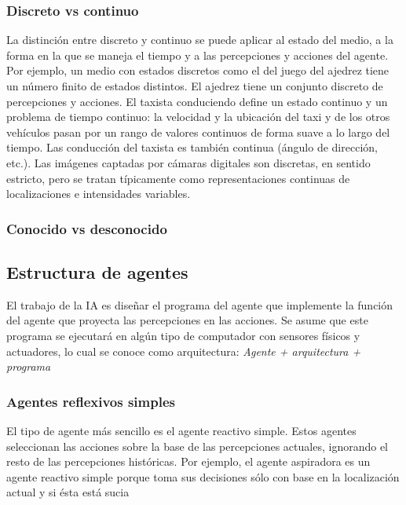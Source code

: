 \documentclass[12pt,a4paper]{report}
\begin{document}
\subsubsection{Discreto vs continuo}
La distinción entre discreto y continuo se puede aplicar al estado del medio, a la forma en la que se maneja el tiempo y a las percepciones y acciones del agente. Por ejemplo, un medio con estados discretos como el del juego del ajedrez tiene un número finito de estados distintos. El ajedrez tiene un conjunto discreto de percepciones y acciones. El taxista conduciendo define un estado continuo y un problema de tiempo continuo: la velocidad y la ubicación del taxi y de los otros vehículos pasan por un rango de valores continuos de forma suave a lo largo del tiempo. Las conducción del taxista es también continua (ángulo de dirección, etc.). Las imágenes captadas por cámaras digitales son discretas, en sentido estricto, pero se tratan típicamente como representaciones continuas de localizaciones e intensidades variables.
\subsubsection{Conocido vs desconocido}

\subsection*{Estructura de agentes}
El trabajo de la IA es diseñar el programa del agente que implemente la función del agente que proyecta las percepciones en las acciones. Se asume que este programa se ejecutará en algún tipo de computador con sensores físicos y actuadores, lo cual se conoce como arquitectura: \emph{Agente + arquitectura + programa}
\subsubsection{Agentes reflexivos simples}
El tipo de agente más sencillo es el agente reactivo simple. Estos agentes seleccionan las acciones sobre la base de las percepciones actuales, ignorando el resto de las percepciones históricas. Por ejemplo, el agente aspiradora es un agente reactivo simple porque toma sus decisiones sólo con base en la localización actual y si ésta está sucia
\end{document}
